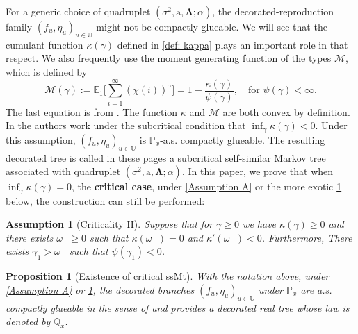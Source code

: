 \documentclass[12pt]{article}
\numberwithin{equation}{section}
\theoremstyle{plain}
\newtheorem{prop}[thm]{Proposition}
\newtheorem{Assump}[thm]{Assumption}
\theoremstyle{definition}
\newcommand{\Bd}[1]{\boldsymbol{#1}}
\begin{document}
For a generic choice of quadruplet $(\sigma^2, \mathrm{a}, \Bd\Lambda; \alpha)$, the decorated-reproduction family $(f_u,\eta_u)_{u\in \mathbb{U}}$ might not be compactly glueable. We will see that the cumulant function $\kappa(\gamma)$ defined in \eqref{def: kappa} plays an important role in that respect. We also frequently use the moment generating function of the types $\mathcal{M}$, which is defined by
\begin{equation}\label{eq: Merlin transform}
\mathcal{M}(\gamma) := \mathbb{E}_1\bigg[\sum^{\infty}_{i=1}(\chi(i))^{\gamma}\bigg] = 1 -\frac{\kappa(\gamma)}{\psi(\gamma)}, \quad \mbox{for } \psi(\gamma)<\infty.
\end{equation}
The last equation is from \cite[Lemma 3.8]{BertoinJean2024SMta}. The function $\kappa$ and $\mathcal{M}$ are both convex by definition. In \cite{BertoinJean2024SMta} the authors work under the subcritical condition that $\inf_{\gamma}\kappa(\gamma)<0$. Under this assumption, $(f_u, \eta_u)_{u\in\mathbb{U}}$ is $\mathbb{P}_x$-a.s. compactly glueable. The resulting decorated tree is called in these pages a subcritical self-similar Markov tree associated with quadruplet $(\sigma^2, \mathrm{a}, \Bd\Lambda; \alpha)$. In this paper, we prove that when $\inf_{\gamma} \kappa(\gamma)=0$, the \textbf{critical case}, under \cref{Assumption A} or the more exotic \cref{Assumption A'} below, the construction can still be performed:

\begin{Assump}[Criticality II]\label{Assumption A'}
Suppose that for $\gamma\geq 0$ we have $\kappa(\gamma)\geq 0$ and there exists $\omega_-\geq 0$ such that $\kappa(\omega_-) = 0$ and $\kappa'(\omega_-)<0$. Furthermore, There exists $\gamma_1 > \omega_-$ such that $\psi(\gamma_1)<0$.
\end{Assump}

\begin{prop}[Existence of critical ssMt]\label{prop: construct ssMt}
With the notation above, under \cref{Assumption A} or \cref{Assumption A'}, the decorated branches $(f_u, \eta_u)_{u\in\mathbb{U}}$ under $\mathbb{P}_x$ are a.s. compactly glueable in the sense of \cite[Definition 1.4]{BertoinJean2024SMta} and provides a decorated real tree whose law is denoted by $\mathbb{Q}_x$.
\end{prop}
\end{document}
